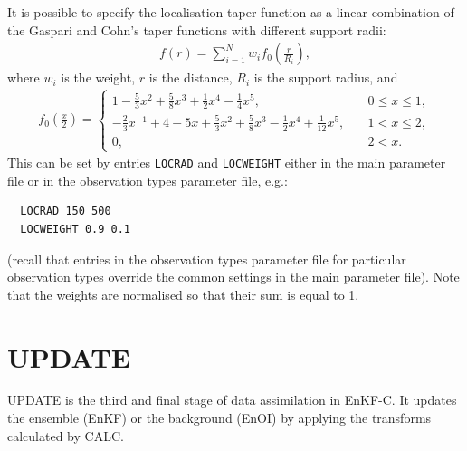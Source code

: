 \documentclass[11pt]{report}
\begin{document}
It is possible to specify the localisation taper function as a linear combination of the Gaspari and Cohn's taper functions with different support radii:
\begin{align*}
  f(r) = \sum_{i=1}^N w_i f_0(\frac{r}{R_i}),
\end{align*}
where $w_i$ is the weight, $r$ is the distance, $R_i$ is the support radius, and
\begin{align*}
  f_0(\frac{x}{2}) = \left\{
  \begin{array}{ll}
    1 - \frac{5}{3} x^2 + \frac{5}{8} x^3 + \frac{1}{2} x^4 -\frac{1}{4} x^5, \quad & 0 \le x \le 1,\\
    -\frac{2}{3} x^{-1} + 4 - 5x + \frac{5}{3}x^2 + \frac{5}{8}x^3 - \frac{1}{2} x^4 + \frac{1}{12}x^5, \quad & 1 < x \le 2,\\
    0, \quad & 2 < x.
  \end{array}
  \right.
\end{align*}
This can be set by entries \verb|LOCRAD| and \verb|LOCWEIGHT| either in the main parameter file or in the observation types parameter file, e.g.:
\begin{Verbatim}
  LOCRAD 150 500
  LOCWEIGHT 0.9 0.1
\end{Verbatim}
(recall that entries in the observation types parameter file for particular observation types override the common settings in the main parameter file).
Note that the weights are normalised so that their sum is equal to 1.

\section{UPDATE}

UPDATE is the third and final stage of data assimilation in EnKF-C.
It updates the ensemble (EnKF) or the background (EnOI) by applying the transforms calculated by CALC.
\end{document}
